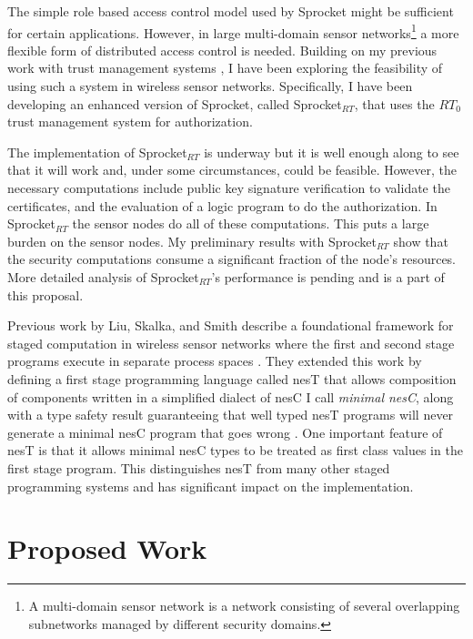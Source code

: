 \documentclass{article}
\begin{document}
The simple role based access control model used by Sprocket might be sufficient for certain
applications. However, in large multi-domain sensor networks\footnote{A multi-domain sensor
  network is a network consisting of several overlapping subnetworks managed by different
  security domains.} a more flexible form of distributed access control is needed. Building on
my previous work with trust management systems \cite{skalka-wang-chapin-jcs06,
  chapin-skalka-wang-acmcs08}, I have been exploring the feasibility of using such a system in
wireless sensor networks. Specifically, I have been developing an enhanced version of Sprocket,
called Sprocket$_{RT}$, that uses the $RT_0$ trust management system \cite{Li:DRBTMF, Li:DCDTM,
  Li:RRBTMF} for authorization.

The implementation of Sprocket$_{RT}$ is underway but it is well enough along to see that it
will work and, under some circumstances, could be feasible. However, the necessary computations
include public key signature verification to validate the certificates, and the evaluation of a
logic program to do the authorization. In Sprocket$_{RT}$ the sensor nodes do all of these
computations. This puts a large burden on the sensor nodes. My preliminary results with
Sprocket$_{RT}$ show that the security computations consume a significant fraction of the node's
resources. More detailed analysis of Sprocket$_{RT}$'s performance is pending and is a part of
this proposal.

Previous work by Liu, Skalka, and Smith describe a foundational framework for staged computation
in wireless sensor networks where the first and second stage programs execute in separate
process spaces \cite{FramedML}. They extended this work by defining a first stage programming
language called nesT that allows composition of components written in a simplified dialect of
nesC I call \textit{minimal nesC}, along with a type safety result guaranteeing that well typed
nesT programs will never generate a minimal nesC program that goes wrong \cite{nesT}. One
important feature of nesT is that it allows minimal nesC types to be treated as first class
values in the first stage program. This distinguishes nesT from many other staged programming
systems and has significant impact on the implementation.

\section{Proposed Work}
\label{sec:ProposedWork}
\end{document}
